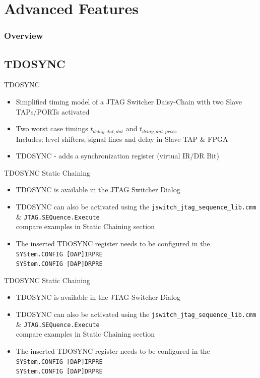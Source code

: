 \documentclass[aspectratio=169,12pt]{beamer}
\begin{document}
\section{Advanced Features}
\begin{frame}
\frametitle{Overview}
\end{frame}
\subsection{TDOSYNC}
\begin{frame}{TDOSYNC}
\begin{itemize}
\item Simplified timing model of a JTAG Switcher Daisy-Chain with two Slave TAPs/PORTs activated
\item Two worst case timings $t_{delay,dut,dut}$ and $t_{delay,dut,probe}$\\Includes: level shifters, signal lines and delay in Slave TAP  \& FPGA
\item<2->[$\Rightarrow$] TDOSYNC - adds a synchronization register (virtual IR/DR Bit)
\end{itemize}
\begin{center}
\resizebox{\textwidth}{!}{

}
\end{center}
\end{frame}

\begin{frame}{TDOSYNC Static Chaining}
\begin{itemize}
\item TDOSYNC is available in the JTAG Switcher Dialog
\item TDOSYNC can also be activated using the \texttt{jswitch\_jtag\_sequence\_lib.cmm} \& \texttt{JTAG.SEQuence.Execute}\\ compare examples in Static Chaining section
\item The inserted TDOSYNC register needs to be configured in the\\ \texttt{SYStem.CONFIG [DAP]IRPRE}\\ \texttt{SYStem.CONFIG [DAP]DRPRE}
\end{itemize}
\end{frame}

\begin{frame}{TDOSYNC Static Chaining}
\begin{itemize}
\item TDOSYNC is available in the JTAG Switcher Dialog
\item TDOSYNC can also be activated using the \texttt{jswitch\_jtag\_sequence\_lib.cmm} \& \texttt{JTAG.SEQuence.Execute}\\ compare examples in Static Chaining section
\item The inserted TDOSYNC register needs to be configured in the\\ \texttt{SYStem.CONFIG [DAP]IRPRE}\\ \texttt{SYStem.CONFIG [DAP]DRPRE}
\end{itemize}
\end{frame}
\end{document}

